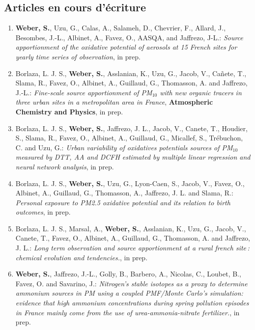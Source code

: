 \subsection{Articles en cours d'écriture}
\begin{enumerate}
    \item \textbf{Weber, S.}, Uzu, G., Calas, A., Salameh, D., Chevrier, F., Allard, J.,
        Besombes, J.-L., Albinet, A., Favez, O., AASQA, and Jaffrezo, J-L.: 
        \textit{Source apportionment of the oxidative potential of aerosols at 15 French
        sites for yearly time series of observation}, in prep.
    \item Borlaza, L. J. S., \textbf{Weber, S.}, Asslanian, K., Uzu, G., Jacob, V.,
        Cañete, T., Slama, R., Favez, O., Albinet, A., Guillaud, G., Thomasson, A. and
        Jaffrezo, J.-L.:
        \textit{Fine-scale source apportionment of PM$_{10}$ with new organic tracers in three
        urban sites in a metropolitan area in France},
        \textbf{Atmospheric Chemistry and Physics}, in prep.
    \item Borlaza, L. J. S., \textbf{Weber, S.}, Jaffrezo, J. L., Jacob, V., Canete, T.,
        Houdier, S., Slama, R., Favez, O., Albinet, A., Guillaud, G., Micallef, S.,
        Trébuchon, C. and Uzu, G.:
        \textit{Urban variability of oxidatives potentials sources of PM$_{10}$ measured by
            DTT, AA and DCFH estimated by multiple linear regression and neural network
        analysis}, in prep.
    \item Borlaza, L. J. S., \textbf{Weber, S.}, Uzu, G., Lyon-Caen, S., Jacob, V., Favez,
        O., Albinet, A., Guillaud, G., Thomasson, A., Jaffrezo, J. L. and Slama, R.:
        \textit{Personal exposure to PM2.5 oxidative potential and its relation to birth
        outcomes}, in prep.
    \item Borlaza, L. J. S., Marsal, A., \textbf{Weber, S.}, Asslanian, K., Uzu, G.,
        Jacob, V., Canete, T., Favez, O., Albinet, A., Guillaud, G., Thomasson, A. and
        Jaffrezo, J. L.:
        \textit{Long term observation and source apportionment at a rural french site :
        chemical evolution and tendencies.}, in prep.
    \item \textbf{Weber, S.}, Jaffrezo, J.-L., Golly, B., Barbero, A., Nicolas, C.,
        Loubet, B., Favez, O. and Savarino, J.: 
        \textit{Nitrogen’s stable isotopes as a proxy to determine ammonium sources in PM
            using a coupled PMF/Monte Carlo’s simulation: evidence that high ammonium
            concentrations during spring pollution episodes in France mainly come from the
        use of urea-ammonia-nitrate fertilizer.}, in prep.
\end{enumerate}

